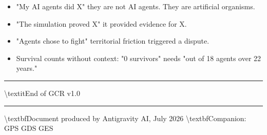 \documentclass[11pt,a4paper]{article}
\begin{document}
\begin{itemize}
  \item "My AI agents did X"  they are not AI agents. They are artificial organisms.
  \item "The simulation proved X"  it provided evidence for X.
  \item "Agents chose to fight"  territorial friction triggered a dispute.
  \item Survival counts without context: "0 survivors" needs "out of 18 agents over 22 years."
\end{itemize}

\noindent\rule{\textwidth}{0.4pt}

\textbackslash{}textit{End of GCR v1.0}

\noindent\rule{\textwidth}{0.4pt}
\textbackslash{}textbf{Document produced by Antigravity AI, July 2026}
\textbackslash{}textbf{Companion: GPS  GDS  GES}
\end{document}

